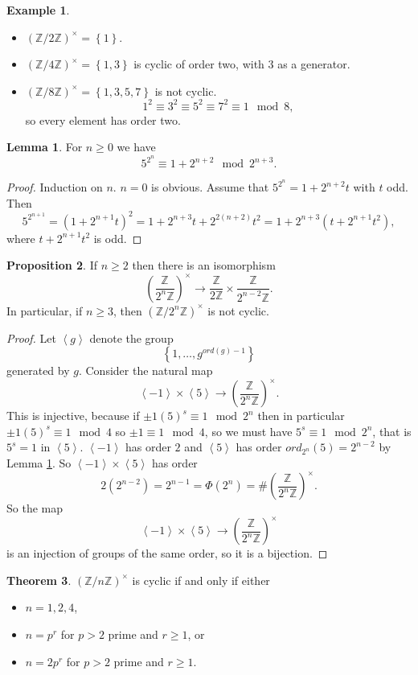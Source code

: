 \documentclass{article}
\newcommand{\Z}{\mathbb{Z}}
\newcommand{\rb}[1]{\left( #1 \right)}
\newcommand{\cb}[1]{\left\{ #1 \right\}}
\newcommand{\ab}[1]{\left\langle #1 \right\rangle}
\newcommand{\Unit}[1]{\rb{\dfrac{\Z}{#1\Z}}^\times}
\newcommand{\unit}[1]{\rb{\Z / #1\Z}^\times}
\theoremstyle{definition}\newtheorem{definition}{Definition}
\theoremstyle{definition}\newtheorem{remark}[definition]{Remark}
\theoremstyle{definition}\newtheorem*{example}{Example}
\theoremstyle{definition}\newtheorem*{note}{Note}
\newtheorem{proposition}[definition]{Proposition}
\newtheorem{lemma}[definition]{Lemma}
\newtheorem{theorem}[definition]{Theorem}
\begin{document}
\begin{example}
\hfill
\begin{itemize}
\item $ \unit{2} = \cb{1} $.
\item $ \unit{4} = \cb{1, 3} $ is cyclic of order two, with $ 3 $ as a generator.
\item $ \unit{8} = \cb{1, 3, 5, 7} $ is not cyclic.
$$ 1^2 \equiv 3^2 \equiv 5^2 \equiv 7^2 \equiv 1 \mod 8, $$
so every element has order two.
\end{itemize}
\end{example}

\begin{lemma}
\label{lem:27}
For $ n \ge 0 $ we have
$$ 5^{2^n} \equiv 1 + 2^{n + 2} \mod 2^{n + 3}. $$
\end{lemma}

\begin{proof}
Induction on $ n $. $ n = 0 $ is obvious. Assume that $ 5^{2^n} = 1 + 2^{n + 2}t $ with $ t $ odd. Then
$$ 5^{2^{n + 1}} = \rb{1 + 2^{n + 1}t}^2 = 1 + 2^{n + 3}t + 2^{2\rb{n + 2}}t^2 = 1 + 2^{n + 3}\rb{t + 2^{n + 1}t^2}, $$
where $ t + 2^{n + 1}t^2 $ is odd.
\end{proof}

\begin{proposition}
If $ n \ge 2 $ then there is an isomorphism
$$ \Unit{2^n} \to \dfrac{\Z}{2\Z} \times \dfrac{\Z}{2^{n - 2}\Z}. $$
In particular, if $ n \ge 3 $, then $ \unit{2^n} $ is not cyclic.
\end{proposition}

\begin{proof}
Let $ \ab{g} $ denote the group
$$ \cb{1, \dots, g^{ord\rb{g} - 1}} $$
generated by $ g $. Consider the natural map
$$ \ab{-1} \times \ab{5} \to \Unit{2^n}. $$
This is injective, because if $ \pm 1\rb{5}^s \equiv 1 \mod 2^n $ then in particular $ \pm 1\rb{5}^s \equiv 1 \mod 4 $ so $ \pm 1 \equiv 1 \mod 4 $, so we must have $ 5^s \equiv 1 \mod 2^n $, that is $ 5^s = 1 $ in $ \ab{5} $. $ \ab{-1} $ has order $ 2 $ and $ \ab{5} $ has order $ ord_{2^n}\rb{5} = 2^{n - 2} $ by Lemma \ref{lem:27}. So $ \ab{-1} \times \ab{5} $ has order
$$ 2\rb{2^{n - 2}} = 2^{n - 1} = \Phi\rb{2^n} = \#\Unit{2^n}. $$
So the map
$$ \ab{-1} \times \ab{5} \to \Unit{2^n} $$
is an injection of groups of the same order, so it is a bijection.
\end{proof}

\begin{theorem}
$ \unit{n} $ is cyclic if and only if either
\begin{itemize}
\item $ n = 1, 2, 4 $,
\item $ n = p^r $ for $ p > 2 $ prime and $ r \ge 1 $, or
\item $ n = 2p^r $ for $ p > 2 $ prime and $ r \ge 1 $.
\end{itemize}
\end{theorem}
\end{document}
